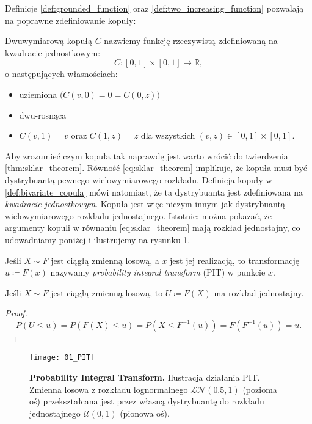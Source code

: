 Definicje \ref{def:grounded_function} oraz \ref{def:two_increasing_function} pozwalają na poprawne zdefiniowanie kopuły:
\begin{df}
	Dwuwymiarową kopułą $C$ nazwiemy funkcję rzeczywistą zdefiniowaną na kwadracie jednostkowym:
	$$ C\colon [0, 1]\times[0, 1] \mapsto \mathbb{R},$$ o następujących własnościach:
	\begin{itemize}
		\item uziemiona $\big(C(v, 0) = 0 = C(0, z)\big)$
		\item dwu-rosnąca
		\item $C(v, 1) = v$ oraz $C(1, z) = z$ dla wszystkich $(v, z)\in [0,1]\times [0, 1].$
	\end{itemize}
	\label{def:bivariate_copula}
\end{df}

Aby zrozumieć czym kopuła tak naprawdę jest warto wrócić do twierdzenia \ref{thm:sklar_theorem}. Równość \ref{eq:sklar_theorem} implikuje, że kopuła musi być dystrybuantą pewnego wielowymiarowego rozkładu. Definicja kopuły w \ref{def:bivariate_copula} mówi natomiast, że ta dystrybuanta jest zdefiniowana na \emph{kwadracie jednostkowym}. Kopuła jest więc niczym innym jak dystrybuantą wielowymiarowego rozkładu jednostajnego. Istotnie: można pokazać, że argumenty kopuli w równaniu \ref{eq:sklar_theorem} mają rozkład jednostajny, co udowadniamy poniżej i ilustrujemy na rysunku \ref{fig:PIT}.

\begin{df}
	Jeśli $X\sim F$ jest ciągłą zmienną losową, a $x$ jest jej realizacją, to transformację $u\coloneqq F(x)$ nazywamy \emph{probability integral transform} (PIT) w punkcie $x$.
	\label{def:PIT}
\end{df}
\begin{thm}
	Jeśli $X\sim F$ jest ciągłą zmienną losową, to $U\coloneqq F(X)$ ma rozkład jednostajny.
\end{thm}
\begin{proof}
	$$P(U\leqslant u) = P(F(X) \leqslant u) = P(X\leqslant F^{-1}(u))=F(F^{-1}(u))=u.$$
\end{proof}

\begin{figure}[H]
	\centering
	\texttt{[image: 01\_PIT]}	
	\caption{\textbf{Probability Integral Transform. } Ilustracja działania PIT. Zmienna losowa z rozkładu lognormalnego $
		\mathcal{LN}(0.5, 1)$ (pozioma oś) przekształcana jest przez własną dystrybuantę do rozkładu jednostajnego $\mathcal{U}(0, 1)$ (pionowa oś).\label{fig:PIT}}
\end{figure}

